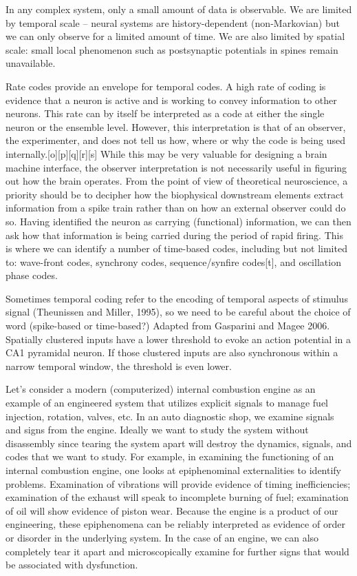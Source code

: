 In any complex system, only a small amount of data is observable. We are limited by temporal scale -- neural systems are history-dependent (non-Markovian) but we can only
observe for a limited amount of time. We are also limited by spatial scale: 
small local phenomenon such as postsynaptic potentials in spines remain unavailable.

Rate codes provide an envelope for temporal codes. A high rate of coding is evidence that a neuron is active and is working to convey information to other neurons. This rate
can by itself be interpreted as a code at either the single neuron or the ensemble level. However, this interpretation is that of an observer, the experimenter, and does not
tell us how, where or why the code is being used internally.[o][p][q][r][s] While this may be very valuable for designing a brain machine interface, the observer
interpretation is not necessarily useful in figuring out how the brain operates. From the point of view of theoretical neuroscience, a priority should be to decipher how the
biophysical downstream elements extract information from a spike train rather than on how an external observer could do so. Having identified the neuron as carrying
(functional) information, we can then ask how that information is being carried during the period of rapid firing. This is where we can identify a number of time-based codes,
including but not limited to: wave-front codes, synchrony codes, sequence/synfire codes[t], and oscillation phase codes.

Sometimes temporal coding refer to the encoding of temporal aspects of stimulus signal (Theunissen and Miller, 1995), so we need to be careful about the choice of word
(spike-based or time-based?)
Adapted from Gasparini and Magee 2006. Spatially clustered inputs have a lower threshold to evoke an action potential in a CA1 pyramidal neuron. If those clustered inputs are
also synchronous within a narrow temporal window, the threshold is even lower.

Let's consider a modern (computerized) internal combustion engine as an example of an engineered system that utilizes explicit signals to manage fuel injection, rotation,
valves, etc. In an auto diagnostic shop, we examine signals and signs from the engine.
Ideally we want to study the system without disassembly since tearing the system apart will destroy the dynamics, signals, and codes that we want to study.
For example, in examining the functioning of an internal combustion engine, one looks at epiphenominal externalities to identify problems. Examination of vibrations will provide
evidence of timing inefficiencies; examination of the exhaust will speak to incomplete burning of fuel; examination of oil will show evidence of piston wear.
Because the engine is a product of our engineering, these epiphenomena can be reliably interpreted as evidence of order or disorder in the underlying system. In the case of an
engine, we can also completely tear it apart and microscopically examine for further signs that would be associated with dysfunction.
